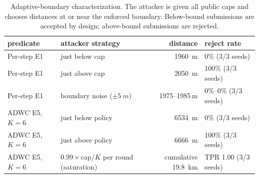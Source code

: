\begin{table}[t]
\centering
\caption{Adaptive-boundary characterization. The attacker is given all public
caps and chooses distances at or near the enforced boundary. Below-bound
submissions are accepted by design; above-bound submissions are rejected.}
\label{tab:adaptive-boundary}
\scriptsize
\setlength{\tabcolsep}{3pt}
\begin{tabularx}{\columnwidth}{@{}Y Y r Y@{}}
\toprule
predicate & attacker strategy & distance & reject rate \\
\midrule
Per-step E1 & just below cap & \SI{1960}{m} & 0\% (3/3 seeds) \\
Per-step E1 & just above cap & \SI{2050}{m} & 100\% (3/3 seeds) \\
Per-step E1 & boundary noise ($\pm\SI{5}{m}$) & 1975--1985\,m & 0\%--0\% (3/3 seeds) \\
ADWC E5, $K{=}6$ & just below policy & \SI{6534}{m} & 0\% (3/3 seeds) \\
ADWC E5, $K{=}6$ & just above policy & \SI{6666}{m} & 100\% (3/3 seeds) \\
ADWC E5, $K{=}6$ & $0.99{\times}$cap/$K$ per round (saturation) & cumulative \SI{19.8}{km} & TPR 1.00 (3/3 seeds) \\
\bottomrule
\end{tabularx}
\end{table}
